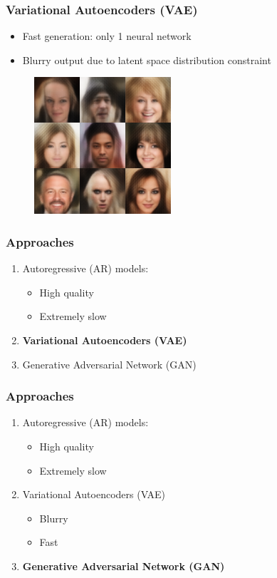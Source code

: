 \documentclass[xcolor=dvipsnames]{beamer}
\begin{document}
\begin{frame}
\frametitle{Variational Autoencoders (VAE)}
\begin{itemize}
	\item Fast generation: only 1 neural network
	\item Blurry output due to latent space distribution constraint
\end{itemize}
\begin{figure}
	\includegraphics[width=0.5\linewidth]{img/vae_small.png}
\end{figure}
\end{frame}



\begin{frame}
\frametitle{Approaches}
\begin{enumerate}
	\item Autoregressive (AR) models:
		\begin{itemize}
			\item High quality
			\item Extremely slow
		\end{itemize}
	\item \textbf{Variational Autoencoders (VAE)}
	\item Generative Adversarial Network (GAN)
\end{enumerate}
\end{frame}



\begin{frame}
\frametitle{Approaches}
\begin{enumerate}
	\item Autoregressive (AR) models:
		\begin{itemize}
			\item High quality
			\item Extremely slow
		\end{itemize}
	\item Variational Autoencoders (VAE)
		\begin{itemize}
			\item Blurry
			\item Fast
		\end{itemize}
	\item \textbf{Generative Adversarial Network (GAN)}
\end{enumerate}
\end{frame}
\end{document}
